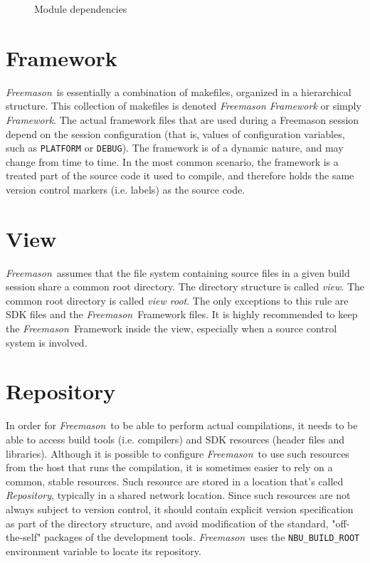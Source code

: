 \documentclass[a4paper]{article}
\newcommand{\freemason}{\textit{Freemason}}
\newcommand{\concept}[1]{\textit{#1}}
\begin{document}
\begin{figure}[h]
\caption{Module dependencies}
\begin{center}\end{center}
\end{figure}

\section{Framework}
    \freemason\ is essentially a combination of makefiles, organized in a hierarchical structure.
	This collection of makefiles is denoted \concept{Freemason Framework} or simply \concept{Framework}.
	The actual framework files that are used during a Freemason session depend on
	the session configuration (that is, values of configuration variables, such as \verb"PLATFORM" or \verb"DEBUG").
	The framework is of a dynamic nature, and may change from time to time. In the most common scenario,
	the framework is a treated part of the source code it used to compile, and therefore holds the same
	version control markers (i.e. labels) as the source code.

\section{View}
    \freemason\ assumes that the file system containing source files in a given build session share a common root directory.
    The directory structure is called \concept{view}. The common root directory is called \concept{view root}.
    The only exceptions to this rule are SDK files and the \freemason\ Framework files. It is highly recommended to keep the
    \freemason\ Framework inside the view, especially when a source control system is involved.

\section{Repository}
    In order for \freemason\ to be able to perform actual compilations, it needs to be able to access build tools (i.e. compilers)
	and SDK resources (header files and libraries). Although it is possible to configure \freemason\ to use such resources from
	the host that runs the compilation, it is sometimes easier to rely on a common, stable resources. Such resource are stored
	in a location that's called \textit{Repository}, typically in a shared network location.
	Since such resources are not always subject to version control, it should contain explicit version specification as part
	of the directory structure, and avoid modification of the standard, "off-the-self" packages of the development tools.
	\freemason\ uses the \verb"NBU_BUILD_ROOT" environment variable to locate its repository.
\end{document}
